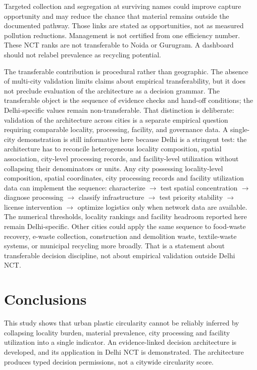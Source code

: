 \documentclass[12pt,a4paper]{article}
\begin{document}
Targeted collection and segregation at surviving names could improve capture opportunity and may reduce the chance that material remains outside the documented pathway. Those links are stated as opportunities, not as measured pollution reductions. Management is not certified from one efficiency number. These NCT ranks are not transferable to Noida or Gurugram. A dashboard should not relabel prevalence as recycling potential.

The transferable contribution is procedural rather than geographic. The absence of multi-city validation limits claims about empirical transferability, but it does not preclude evaluation of the architecture as a decision grammar. The transferable object is the sequence of evidence checks and hand-off conditions; the Delhi-specific values remain non-transferable. That distinction is deliberate: validation of the architecture across cities is a separate empirical question requiring comparable locality, processing, facility, and governance data. A single-city demonstration is still informative here because Delhi is a stringent test: the architecture has to reconcile heterogeneous locality composition, spatial association, city-level processing records, and facility-level utilization without collapsing their denominators or units. Any city possessing locality-level composition, spatial coordinates, city processing records and facility utilization data can implement the sequence: characterize $\rightarrow$ test spatial concentration $\rightarrow$ diagnose processing $\rightarrow$ classify infrastructure $\rightarrow$ test priority stability $\rightarrow$ license intervention $\rightarrow$ optimize logistics only when network data are available. The numerical thresholds, locality rankings and facility headroom reported here remain Delhi-specific. Other cities could apply the same sequence to food-waste recovery, e-waste collection, construction and demolition waste, textile-waste systems, or municipal recycling more broadly. That is a statement about transferable decision discipline, not about empirical validation outside Delhi NCT.

\section{Conclusions}
\label{sec:conclusion}

This study shows that urban plastic circularity cannot be reliably inferred by collapsing locality burden, material prevalence, city processing and facility utilization into a single indicator. An evidence-linked decision architecture is developed, and its application in Delhi NCT is demonstrated. The architecture produces typed decision permissions, not a citywide circularity score.
\end{document}
